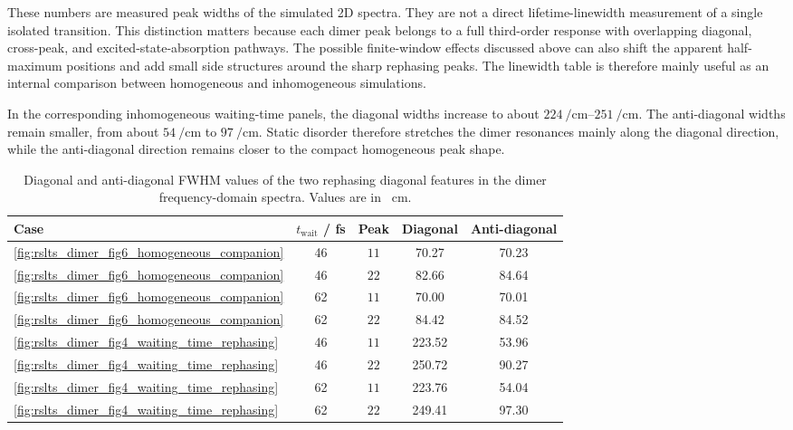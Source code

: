 These numbers are measured peak widths of the simulated 2D spectra. They are not a direct lifetime-linewidth measurement of a single isolated transition. This distinction matters because each dimer peak belongs to a full third-order response with overlapping diagonal, cross-peak, and excited-state-absorption pathways. The possible finite-window effects discussed above can also shift the apparent half-maximum positions and add small side structures around the sharp rephasing peaks. The linewidth table is therefore mainly useful as an internal comparison between homogeneous and inhomogeneous simulations.

In the corresponding inhomogeneous waiting-time panels, the diagonal widths increase to about \(\SIrange{224}{251}{\per\centi\metre}\). The anti-diagonal widths remain smaller, from about \(\SI{54}{\per\centi\metre}\) to \(\SI{97}{\per\centi\metre}\). Static disorder therefore stretches the dimer resonances mainly along the diagonal direction, while the anti-diagonal direction remains closer to the compact homogeneous peak shape.

\begin{table}[htbp]
    \centering
    \small
    \caption{Diagonal and anti-diagonal FWHM values of the two rephasing diagonal features in the dimer frequency-domain spectra. Values are in \si{\per\centi\metre}.}
    \label{tab:results_dimer_rephasing_linewidths}
    \begin{tabular}{@{}lcccc@{}}
        \toprule
        Case & $t_{\mathrm{wait}}$ / fs & Peak & Diagonal & Anti-diagonal \\
        \midrule
        \autoref{fig:rslts_dimer_fig6_homogeneous_companion} & 46 & $11$ & 70.27 & 70.23 \\
        \autoref{fig:rslts_dimer_fig6_homogeneous_companion} & 46 & $22$ & 82.66 & 84.64 \\
        \autoref{fig:rslts_dimer_fig6_homogeneous_companion} & 62 & $11$ & 70.00 & 70.01 \\
        \autoref{fig:rslts_dimer_fig6_homogeneous_companion} & 62 & $22$ & 84.42 & 84.52 \\
        \autoref{fig:rslts_dimer_fig4_waiting_time_rephasing} & 46 & $11$ & 223.52 & 53.96 \\
        \autoref{fig:rslts_dimer_fig4_waiting_time_rephasing} & 46 & $22$ & 250.72 & 90.27 \\
        \autoref{fig:rslts_dimer_fig4_waiting_time_rephasing} & 62 & $11$ & 223.76 & 54.04 \\
        \autoref{fig:rslts_dimer_fig4_waiting_time_rephasing} & 62 & $22$ & 249.41 & 97.30 \\
        \bottomrule
    \end{tabular}
\end{table}


